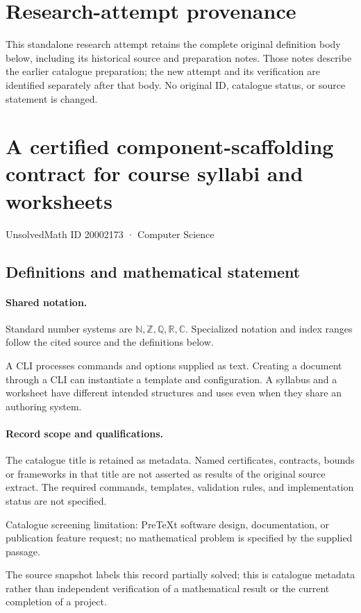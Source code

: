 \documentclass[11pt]{article}
\begin{document}
\section*{Research-attempt provenance}
This standalone research attempt retains the complete original definition body below,
including its historical source and preparation notes. Those notes describe the
earlier catalogue preparation; the new attempt and its verification are identified
separately after that body. No original ID, catalogue status, or source statement is changed.

\section{A certified component-scaffolding contract for course syllabi and worksheets}\label{20002173}
{\small UnsolvedMath ID 20002173 · Computer Science}
\subsection{Definitions and mathematical statement}

\paragraph{Shared notation.}Standard number systems are $\mathbb N,\mathbb Z,\mathbb Q,\mathbb R,\mathbb C$. Specialized notation and index ranges follow the cited source and the definitions below.


A CLI processes commands and options supplied as text. Creating a document through a CLI can instantiate a template and configuration. A syllabus and a worksheet have different intended structures and uses even when they share an authoring system.
\paragraph{Record scope and qualifications.}
The catalogue title is retained as metadata. Named certificates, contracts, bounds or frameworks in that title are not asserted as results of the original source extract.
The required commands, templates, validation rules, and implementation status are not specified.

Catalogue screening limitation: PreTeXt software design, documentation, or publication feature request; no mathematical problem is specified by the supplied passage.

The source snapshot labels this record partially solved; this is catalogue metadata rather than independent verification of a mathematical result or the current completion of a project.
\end{document}
